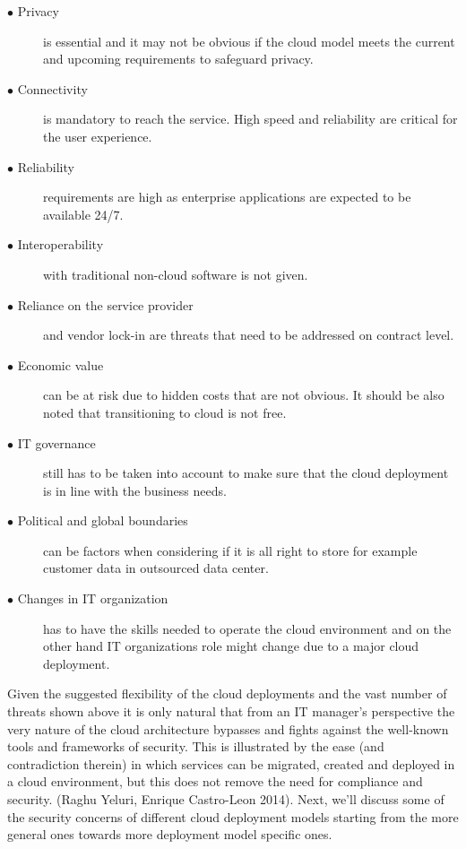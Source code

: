 \documentclass{article}
\begin{document}
\begin{description}
        \item[$\bullet$ Privacy] is essential and it may not be obvious if the cloud model meets the current and upcoming requirements to safeguard privacy.
        \item[$\bullet$ Connectivity] is mandatory to reach the service. High speed and reliability are critical for the user experience.
        \item[$\bullet$ Reliability] requirements are high as enterprise applications are expected to be available 24/7.
        \item[$\bullet$ Interoperability] with traditional non-cloud software is not given.
        \item[$\bullet$ Reliance on the service provider] and vendor lock-in are threats that need to be addressed on contract level.
        \item[$\bullet$ Economic value] can be at risk due to hidden costs that are not obvious. It should be also noted that transitioning to cloud is not free.
        \item[$\bullet$ IT governance] still has to be taken into account to make sure that the cloud deployment is in line with the business needs.
        \item[$\bullet$ Political and global boundaries] can be factors when considering if it is all right to store for example customer data in outsourced data center.
        \item[$\bullet$ Changes in IT organization] has to have the skills needed to operate the cloud environment and on the other hand IT organizations role might change due to a major cloud deployment.
\end{description}
Given the suggested flexibility of the cloud deployments and the vast number of threats shown above it is only natural that from an IT manager's perspective the very nature of the cloud architecture bypasses and fights against the well-known tools and frameworks of security.
This is illustrated by the ease (and contradiction therein) in which services can be migrated, created and deployed in a cloud environment, but this does not remove the need for compliance and security. (Raghu Yeluri, Enrique Castro-Leon 2014). 
Next, we'll discuss some of the security concerns of different cloud deployment models starting from the more general ones towards more deployment model specific ones.
\end{document}
